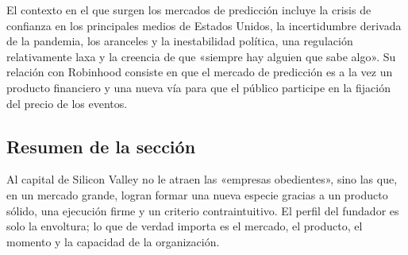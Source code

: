 El contexto en el que surgen los mercados de predicción incluye la crisis de confianza en los principales medios de Estados Unidos, la incertidumbre derivada de la pandemia, los aranceles y la inestabilidad política, una regulación relativamente laxa y la creencia de que «siempre hay alguien que sabe algo». Su relación con Robinhood consiste en que el mercado de predicción es a la vez un producto financiero y una nueva vía para que el público participe en la fijación del precio de los eventos.

\subsection{Resumen de la sección}

Al capital de Silicon Valley no le atraen las «empresas obedientes», sino las que, en un mercado grande, logran formar una nueva especie gracias a un producto sólido, una ejecución firme y un criterio contraintuitivo. El perfil del fundador es solo la envoltura; lo que de verdad importa es el mercado, el producto, el momento y la capacidad de la organización.
